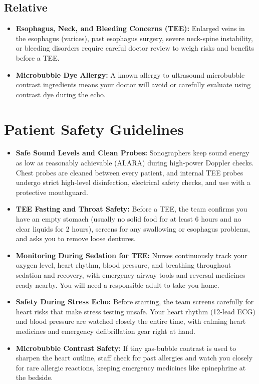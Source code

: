 \subsection{Relative}
\begin{itemize}
\item \textbf{Esophagus, Neck, and Bleeding Concerns (TEE):} Enlarged veins in the esophagus (varices), past esophagus surgery, severe neck-spine instability, or bleeding disorders require careful doctor review to weigh risks and benefits before a TEE.
\item \textbf{Microbubble Dye Allergy:} A known allergy to ultrasound microbubble contrast ingredients means your doctor will avoid or carefully evaluate using contrast dye during the echo.
\end{itemize}

\section{Patient Safety Guidelines}
\begin{itemize}
\item \textbf{Safe Sound Levels and Clean Probes:} Sonographers keep sound energy as low as reasonably achievable (ALARA) during high-power Doppler checks. Chest probes are cleaned between every patient, and internal TEE probes undergo strict high-level disinfection, electrical safety checks, and use with a protective mouthguard.
\item \textbf{TEE Fasting and Throat Safety:} Before a TEE, the team confirms you have an empty stomach (usually no solid food for at least 6 hours and no clear liquids for 2 hours), screens for any swallowing or esophagus problems, and asks you to remove loose dentures.
\item \textbf{Monitoring During Sedation for TEE:} Nurses continuously track your oxygen level, heart rhythm, blood pressure, and breathing throughout sedation and recovery, with emergency airway tools and reversal medicines ready nearby. You will need a responsible adult to take you home.
\item \textbf{Safety During Stress Echo:} Before starting, the team screens carefully for heart risks that make stress testing unsafe. Your heart rhythm (12-lead ECG) and blood pressure are watched closely the entire time, with calming heart medicines and emergency defibrillation gear right at hand.
\item \textbf{Microbubble Contrast Safety:} If tiny gas-bubble contrast is used to sharpen the heart outline, staff check for past allergies and watch you closely for rare allergic reactions, keeping emergency medicines like epinephrine at the bedside.
\end{itemize}

